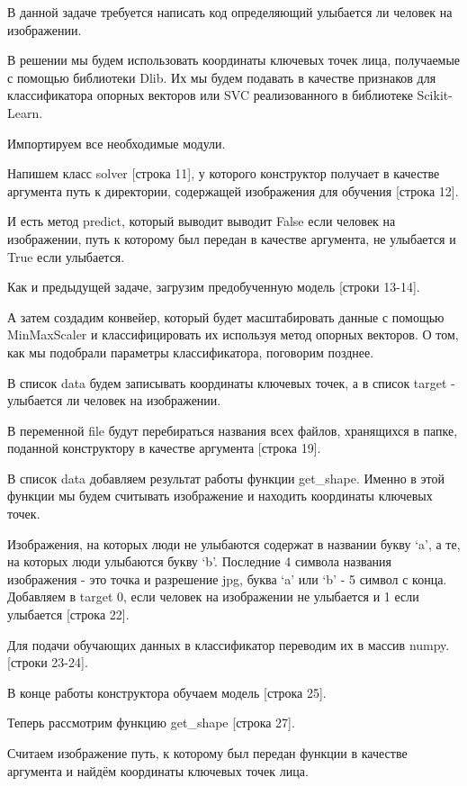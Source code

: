 \solutionSection

В данной задаче требуется написать код определяющий улыбается ли человек на изображении.

В решении мы будем использовать координаты ключевых точек лица, получаемые с помощью библиотеки Dlib. Их мы будем подавать в качестве признаков для классификатора опорных векторов или SVC реализованного в библиотеке Scikit-Learn.

Импортируем все необходимые модули.

Напишем класс solver [строка 11], у которого конструктор получает в качестве аргумента путь к директории, содержащей изображения для обучения [строка 12].

И есть метод predict, который выводит выводит False если человек на изображении, путь к которому был передан в качестве аргумента, не улыбается и True если улыбается.

Как и предыдущей задаче, загрузим предобученную модель [строки 13-14].

А затем создадим конвейер, который будет масштабировать данные с помощью MinMaxScaler и классифицировать их используя метод опорных векторов. О том, как мы подобрали параметры классификатора, поговорим позднее.

В список data будем записывать координаты ключевых точек, а в список target - улыбается ли человек на изображении.

В переменной file будут перебираться названия всех файлов, хранящихся в папке, поданной конструктору в качестве аргумента [строка 19].

В список data добавляем результат работы функции get\_shape. Именно в этой функции мы будем считывать изображение и находить координаты ключевых точек.

Изображения, на которых люди не улыбаются содержат в названии букву ‘a’, а те, на которых люди улыбаются букву ‘b’. Последние 4 символа названия изображения - это точка и разрешение jpg, буква ‘a’ или ‘b’ - 5 символ с конца. Добавляем в target 0, если человек на изображении не улыбается и 1 если улыбается [строка 22].

Для подачи обучающих данных в классификатор переводим их в массив numpy. [строки 23-24].

В конце работы конструктора обучаем модель [строка 25].

Теперь рассмотрим функцию get\_shape [строка 27].

Считаем изображение путь, к которому был передан функции в качестве аргумента и найдём координаты ключевых точек лица.

